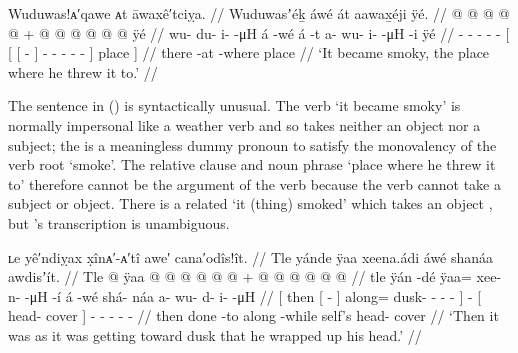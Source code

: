 \ex\label{ex:90-32-smoke-on-the-water}%
%
\begingl
	\glpreamble	Wuduwas!ᴀ′qawe ᴀt āwaxê′tciỵa. //
	\glpreamble	Wuduwasʼéḵ áwé át aawax̱éji ÿé. //
	\gla	{} @ {} @ {} @ {} @ {}
		 @ {} +
		{} {} {}  @ {} {}
			 @ {} @ {} @ {} @ {} @ {} {} ÿé {} //
	\glb	wu- du- i-  -μH
		á -wé
		{} {} {} á -t {}
			a- wu- i-  -μH -i {} ÿé {} //
	\glc	{}- - -  -
		 -
		{}[ {}[ {}[  - {}]
			- - -  - - {}] place {}] //
	\gld	{} {} {} {} {}
		 {}
		{} {} {} there -at {}
			 {} {} {} {} -where {} place {} //
	\glft	‘It became smoky, the place where he threw it to.’
		//
\endgl
\xe

The sentence in (\lastx) is syntactically unusual.
The verb  ‘it became smoky’ is normally impersonal like a weather verb and so takes neither an object nor a subject; the  is a meaningless dummy pronoun to satisfy the monovalency of the verb root  ‘smoke’.
The relative clause and noun phrase  ‘place where he threw it to’ therefore cannot be the argument of the verb because the verb cannot take a subject or object.
There is a related  ‘it (thing) smoked’ which takes an object  \parencite[524]{leer:1976}, but \citeauthor{swanton:1909}’s transcription  is unambiguous.

\ex\label{ex:90-33-dusk-wrap-head}%
%
\begingl
	\glpreamble	ʟe yê′ndiỵax x̣înᴀ′-ᴀ′tî awe′ cana′odîs!ît. //
	\glpreamble	Tle yánde ÿaa xeena.ádi áwé shanáa awdisʼít. //
	\gla	{} Tle {}  @ {} {}
			ÿaa @  @ {} @ {} @ {} @ {} {}
		 @ {} +
		{} {}  @ {} {}
		 @ {} @ {} @ {} @ {} @ {} //
	\glb	{} tle {} ÿán -dé {}
			ÿaa= xee- n-  -μH -í {}
		á -wé
		{} {} shá- náa {}
		a- wu- d- i-  -μH //
	\glc	{}[ then {}[  - {}]
			along= dusk- -  - - {}]
		 -
		{}[  head- cover {}]
		- - - -  - //
	\gld	{} then {} done -to {}
			along  {} {} {} -while {}
		 {}
		{} self’s head- cover {}
		 {} {} {} {} {} //
	\glft	‘Then it was as it was getting toward dusk that he wrapped up his head.’
		//
\endgl
\xe

